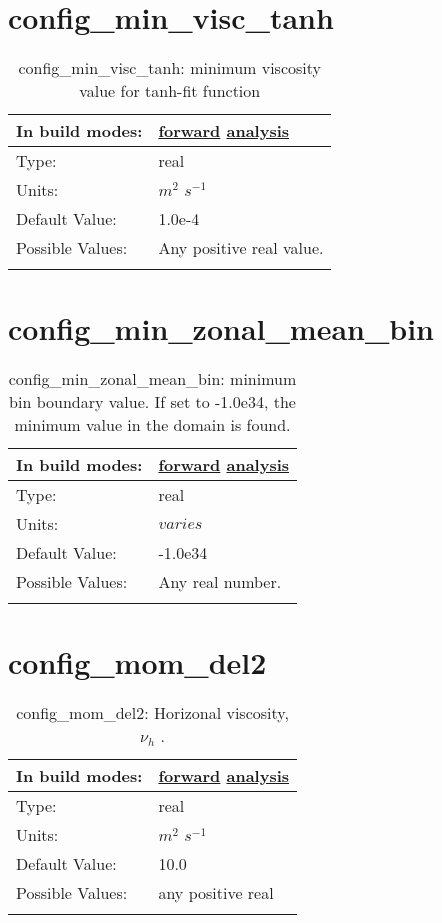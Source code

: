 \section[config\_min\_visc\_tanh]{config\_min\_visc\_tanh}
\label{sec:nm_sec_config_min_visc_tanh}
\begin{center}
\begin{longtable}{| p{2.0in} || p{4.0in} |}
    \hline
    In build modes: & \hyperref[subsec:forward_nm_tab_vmix_tanh]{forward} \hyperref[subsec:analysis_nm_tab_vmix_tanh]{analysis} \\
    \hline
    Type: & real \\
    \hline
    Units: & $m^2$ $s^{-1}$ \\
    \hline
    Default Value: & 1.0e-4 \\
    \hline
    Possible Values: & Any positive real value. \\
    \hline
    \caption{config\_min\_visc\_tanh: minimum viscosity value for tanh-fit function}
\end{longtable}
\end{center}
\section[config\_min\_zonal\_mean\_bin]{config\_min\_zonal\_mean\_bin}
\label{sec:nm_sec_config_min_zonal_mean_bin}
\begin{center}
\begin{longtable}{| p{2.0in} || p{4.0in} |}
    \hline
    In build modes: & \hyperref[subsec:forward_nm_tab_zonal_mean]{forward} \hyperref[subsec:analysis_nm_tab_zonal_mean]{analysis} \\
    \hline
    Type: & real \\
    \hline
    Units: & $varies$ \\
    \hline
    Default Value: & -1.0e34 \\
    \hline
    Possible Values: & Any real number. \\
    \hline
    \caption{config\_min\_zonal\_mean\_bin: minimum bin boundary value.  If set to -1.0e34, the minimum value in the domain is found.}
\end{longtable}
\end{center}
\section[config\_mom\_del2]{config\_mom\_del2}
\label{sec:nm_sec_config_mom_del2}
\begin{center}
\begin{longtable}{| p{2.0in} || p{4.0in} |}
    \hline
    In build modes: & \hyperref[subsec:forward_nm_tab_hmix_del2]{forward} \hyperref[subsec:analysis_nm_tab_hmix_del2]{analysis} \\
    \hline
    Type: & real \\
    \hline
    Units: & $m^2$ $s^{-1}$ \\
    \hline
    Default Value: & 10.0 \\
    \hline
    Possible Values: & any positive real \\
    \hline
    \caption{config\_mom\_del2:  Horizonal viscosity,  $\nu_h$ .}
\end{longtable}
\end{center}
